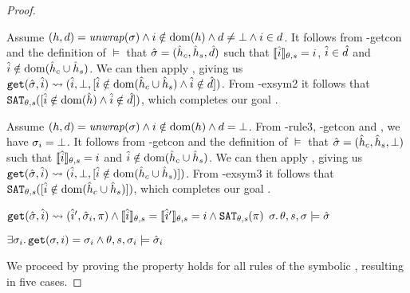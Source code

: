 \begin{proof}

\begin{hypvlist}
 Assume $(h,d)={\operatorname{\mathit{unwrap}}}(\sigma) \land i\notin\operatorname{dom}(h) \land d\neq\bot \land i\in d$.
 It follows from \hyp{getcon} and the definition of $\models$ that $\hat{\sigma}=(\hat{h}_c, \hat{h}_s, \hat{d})$ such that $\llbracket\hat{i}\rrbracket_{\theta,s}=i$, $\hat{i}\in \hat{d}$ and $\hat{i}\notin \operatorname{dom}(\hat{h}_c \cup \hat{h}_s)$.
 We can then apply , giving us $\texttt{get}(\hat{\sigma},\hat{i})\rightsquigarrow(\hat{i},\bot,[\hat{i}\notin \operatorname{dom}(\hat{h}_c \cup \hat{h}_s) \land \hat{i}\notin \hat{d}])$.%
 From \hyp{exsym2} it follows that $\texttt{SAT}_{\mathit{\theta,s}}([\hat{i}\notin \operatorname{dom}(\hat{h}) \land \hat{i}\notin \hat{d}])$, which completes our goal .
\end{hypvlist}


\begin{hypvlist}
 Assume $(h,d)={\operatorname{\mathit{unwrap}}}(\sigma) \land i\notin\operatorname{dom}(h) \land d=\bot$.
 From \hyp{rule3}, \hyp{getcon} and , we have $\sigma_i=\bot$.
 It follows from \hyp{getcon} and the definition of $\models$ that $\hat{\sigma}=(\hat{h}_c, \hat{h}_s, \bot)$ such that $\llbracket\hat{i}\rrbracket_{\theta,s}=i$ and $\hat{i}\notin \operatorname{dom}(\hat{h}_c\cup \hat{h}_s)$.
 We can then apply , giving us ${\texttt{get}(\hat{\sigma},\hat{i})\rightsquigarrow(\hat{i},\bot,[\hat{i}\notin \operatorname{dom}(\hat{h}_c\cup \hat{h}_s)])}$.%
 From \hyp{exsym3} it follows that $\texttt{SAT}_{\mathit{\theta,s}}([\hat{i}\notin \operatorname{dom}(\hat{h}_c\cup\hat{h}_s)])$, which completes our goal .
\end{hypvlist}


\pfassume \begin{hypvlist}
 $\texttt{get}(\hat{\sigma},\hat{i})\rightsquigarrow(\hat{i}', \hat{\sigma}_i, \pi) \land \llbracket\hat{i}\rrbracket_{\theta,s}=\llbracket\hat{i}'\rrbracket_{\theta,s}=i \land \texttt{SAT}_{\mathit{\theta,s}}(\pi) $
 $\sigma\ldotp \theta,s,\sigma \models \hat{\sigma}$
\end{hypvlist}
\pfprove \begin{goalvlist}
 $\exists \sigma_i \ldotp \texttt{get}(\sigma, i)=\sigma_i \land \theta,s,\sigma_i \models \hat{\sigma}_i$
\end{goalvlist}

We proceed by proving the property holds for all rules of the symbolic , resulting in five cases.



\end{proof}
